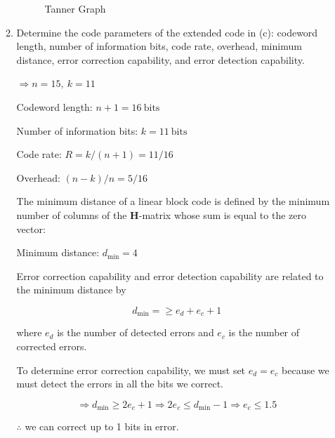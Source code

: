 \documentclass[fleqn]{article}
\begin{document}
\begin{enumerate}
\begin{enumerate}
			\begin{figure}[H]
				\centerline{}
				\caption{Tanner Graph}
				\label{fig::tanner_graph}
			\end{figure}

			\item Determine the code parameters of the extended code in (c): codeword length, number of information bits, code rate, overhead, minimum distance, error correction capability, and error detection capability.
			
			$\Rightarrow n = 15,\ k = 11$
						
			Codeword length: $n + 1 = 16\ \text{bits}$
			
			Number of information bits: $k = 11\ \text{bits}$
			
			Code rate: $R = k/(n+1) = 11/16$
			
			Overhead: $(n - k)/n = 5/16$
			
			The minimum distance of a linear block code is defined by the minimum number of columns of the $\mathbf{H}$-matrix whose sum is equal to the zero vector:
			
			Minimum distance: $d_\text{min} = 4$
			
			Error correction capability and error detection capability are related to the minimum distance by
			
			\begin{equation*}
				d_{\text{min}} = \geq e_d + e_c + 1
			\end{equation*}
			
			where $e_d$ is the number of detected errors and $e_c$ is the number of corrected errors.
			
			To determine error correction capability, we must set $e_d = e_c$ because we must detect the errors in all the bits we correct.
			
			\begin{equation*}
				\Rightarrow d_{\text{min}} \geq 2e_c + 1 \Rightarrow 2e_c \leq d_{\text{min}} - 1 \Rightarrow e_c \leq 1.5
			\end{equation*}
			
			$\therefore$ we can correct up to 1 bits in error.
			

\end{enumerate}
\end{enumerate}
\end{document}
